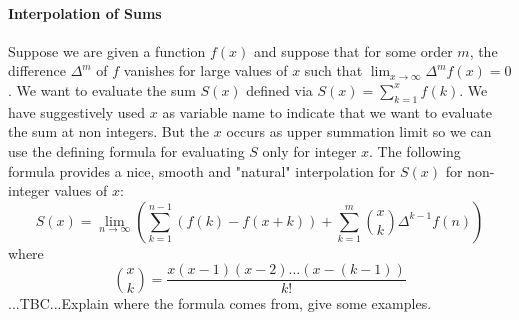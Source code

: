 \paragraph{Interpolation of Sums}
Suppose we are given a function $f(x)$ and suppose that for some order $m$, the difference $\Delta^m$ of $f$ vanishes for large values of $x$ such that $\lim_{x \rightarrow \infty} \Delta^m f(x) = 0$. We want to evaluate the sum $S(x)$ defined via $S(x) = \sum_{k=1}^{x} f(k)$. We have suggestively used $x$ as variable name to indicate that we want to evaluate the sum at non integers. But the $x$ occurs as upper summation limit so we can use the defining formula for evaluating $S$ only for integer $x$. The following formula provides a nice, smooth and "natural" interpolation for $S(x)$ for non-integer values of $x$:
\begin{equation}
S(x) = \lim_{n \rightarrow \infty} 
\left(   \sum_{k=1}^{n-1} \left(f(k) - f(x+k) \right) 
       + \sum_{k=1}^{m} \binom{x}{k} \Delta^{k-1} f(n)  \right)
\end{equation}
where
\begin{equation}
\binom{x}{k} = \frac{x (x-1) (x-2) \ldots (x-(k-1)) }{k!}
\end{equation}
...TBC...Explain where the formula comes from, give some examples.





